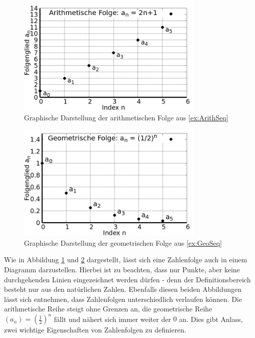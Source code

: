 \begin{figure}
	\centering
	\includegraphics[width=0.8\textwidth]{./gnuplot/example-arithmetic-series.png}
	\caption{Graphische Darstellung der arithmetischen Folge aus \ref{ex:ArithSeq}}
	\label{fig:ExArithSeq}
\end{figure}

\begin{figure}
	\centering
	\includegraphics[width=0.8\textwidth]{./gnuplot/example-geometric-series.png}
	\caption{Graphische Darstellung der geometrischen Folge aus \ref{ex:GeoSeq}}
	\label{fig:ExGeoSeq}
\end{figure}

Wie in Abbildung \ref{fig:ExArithSeq} und \ref{fig:ExGeoSeq} dargestellt, lässt sich eine Zahlenfolge auch in einem Diagramm darzustellen. Hierbei ist zu beachten, dass nur Punkte, aber keine durchgehenden Linien eingezeichnet werden dürfen - denn der Definitionsbereich besteht nur aus den natürlichen Zahlen. Ebenfalls diesen beiden Abbildungen lässt sich entnehmen, dass Zahlenfolgen unterschiedlich verlaufen können. Die arithmetische Reihe steigt ohne Grenzen an, die geometrische Reihe $(a_n) = (\frac{1}{2})^n$ fällt und nähert sich immer weiter der $0$ an. Dies gibt Anlass, zwei wichtige Eigenschaften von Zahlenfolgen zu definieren.

